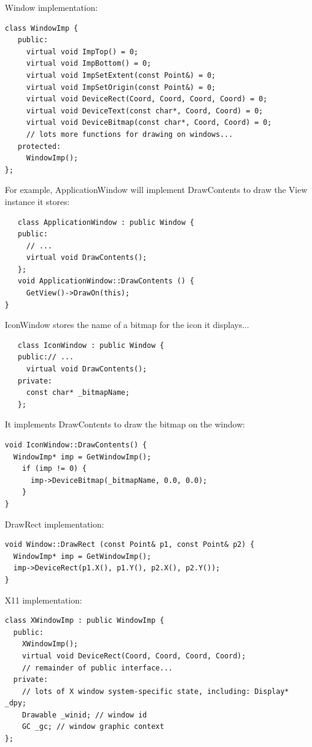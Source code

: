 \documentclass[11pt]{report}
\begin{document}
Window implementation:
\begin{lstlisting}
class WindowImp {
   public:
     virtual void ImpTop() = 0;
     virtual void ImpBottom() = 0;
     virtual void ImpSetExtent(const Point&) = 0;
     virtual void ImpSetOrigin(const Point&) = 0;
     virtual void DeviceRect(Coord, Coord, Coord, Coord) = 0;
     virtual void DeviceText(const char*, Coord, Coord) = 0;
     virtual void DeviceBitmap(const char*, Coord, Coord) = 0;
     // lots more functions for drawing on windows...
   protected:
     WindowImp();
};
\end{lstlisting}

For example, ApplicationWindow will implement DrawContents to draw the View instance it stores:
\begin{lstlisting}
   class ApplicationWindow : public Window {
   public:
     // ...
     virtual void DrawContents();
   };
   void ApplicationWindow::DrawContents () {
     GetView()->DrawOn(this);
}
\end{lstlisting}

IconWindow stores the name of a bitmap for the icon it displays...
\begin{lstlisting}
   class IconWindow : public Window {
   public:// ...
     virtual void DrawContents();
   private:
     const char* _bitmapName;
   };
\end{lstlisting}

It implements DrawContents to draw the bitmap on the window:
\begin{lstlisting}
void IconWindow::DrawContents() {
  WindowImp* imp = GetWindowImp();
    if (imp != 0) {
      imp->DeviceBitmap(_bitmapName, 0.0, 0.0);
    }
}
\end{lstlisting}

DrawRect implementation:
\begin{lstlisting}
void Window::DrawRect (const Point& p1, const Point& p2) {
  WindowImp* imp = GetWindowImp();
  imp->DeviceRect(p1.X(), p1.Y(), p2.X(), p2.Y());
}
\end{lstlisting}

X11 implementation:
\begin{lstlisting}
class XWindowImp : public WindowImp {
  public:
    XWindowImp();
    virtual void DeviceRect(Coord, Coord, Coord, Coord);
    // remainder of public interface...
  private:
    // lots of X window system-specific state, including: Display* _dpy;
    Drawable _winid; // window id
    GC _gc; // window graphic context 
};
\end{lstlisting}
\end{document}
